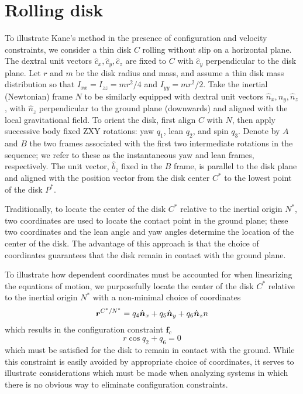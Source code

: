 \section{Rolling disk}
\label{sec:example}
To illustrate Kane's method in the presence of configuration and velocity
constraints, we consider a thin disk $C$ rolling without slip on a horizontal
plane. The dextral unit vectors $\hat{c}_x, \hat{c}_y, \hat{c}_z$ are fixed to $C$
with $\hat{c}_y$ perpendicular to the disk plane. Let $r$ and $m$ be the
disk radius and mass, and assume a thin disk mass distribution so that
$I_{xx}=I_{zz}=mr^2/4$ and $I_{yy} = mr^2/2$. Take the inertial (Newtonian)
frame $N$ to be similarly equipped with dextral unit vectors $\hat{n}_x,
\hat{n}_y, \hat{n}_z$, with $\hat{n}_z$ perpendicular to the ground plane
(downwards) and aligned with the local gravitational field. To orient the disk,
first align $C$ with $N$, then apply successive body fixed ZXY rotations:
yaw $q_1$, lean $q_2$, and spin $q_3$.  Denote by $A$ and $B$ the two frames
associated with the first two intermediate rotations in the sequence; we refer
to these as the instantaneous yaw and lean frames, respectively. The unit
vector, $\hat{b}_z$ fixed in the $B$ frame, is parallel to the disk plane and
aligned with the position vector from the disk center $C^*$ to the lowest point
of the disk $P^*$.

Traditionally, to locate the center of the disk $C^*$
relative to the inertial origin $N^*$, two coordinates are used to locate the
contact point in the ground plane; these two coordinates and the lean angle
and yaw angles determine the location of the center of the disk. The advantage of this
approach is that the choice of coordinates guarantees that the disk remain in
contact with the ground plane.

To illustrate how dependent coordinates must be
accounted for when linearizing the equations of motion, we purposefully locate
the center of the disk $C^*$ relative to the inertial origin $N^*$ with a
non-minimal choice of coordinates
\begin{equation*}
  \boldsymbol{r}^{C^*/N^*} = q_4 \hat{\boldsymbol{n}}_{x} + q_5 \hat{\boldsymbol{n}}_{y} + q_6 \hat{\boldsymbol{n}}_{z}{n}
\end{equation*}
which results in the configuration constraint $\mathbf{f}_c$
\begin{equation}
  \label{rd:f_c}
  r\cos{q_2} + q_6 = 0
\end{equation}
which must be satisfied for the disk to remain in contact with the ground.
While this constraint is easily avoided by appropriate choice of coordinates,
it serves to illustrate considerations which must be made when analyzing
systems in which there is no obvious way to eliminate configuration constraints.

